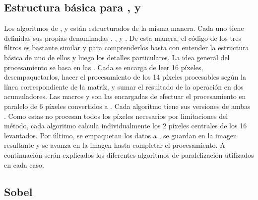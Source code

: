 \vspace{1cm}

\subsection{Estructura básica para ,  y }
	Los algoritmos de ,  y  están estructurados de la misma manera. Cada uno tiene 
definidas sus propias  denominadas , ,  y . 
De esta manera, el código de los tres filtros es bastante similar y para comprenderlos basta con entender la estructura básica de uno de 
ellos y luego los detalles particulares. La idea general del procesamiento se basa en las  . Cada 
 se encarga de leer 16 píxeles, desempaquetarlos, hacer el procesamiento de los 14 píxeles procesables según la línea correspondiente de la 
matríz, y sumar el resultado de la operación en dos acumuladores. Las macros  y  son las encargadas de 
efectuar el procesamiento en paralelo de 6 píxeles convertidos a . Cada algoritmo tiene sus versiones de ambas .
 Como estas  no procesan todos los píxeles necesarios por limitaciones del método, cada algoritmo calcula individualmente 
los 2 píxeles centrales de los 16 levantados. Por último, se empaquetan los datos a , se guardan en la imagen resultante y
se avanza en la imagen hasta completar el procesamiento. A continuación serán explicados los diferentes algoritmos de paralelización utilizados 
en cada caso.

\subsection{Sobel}

